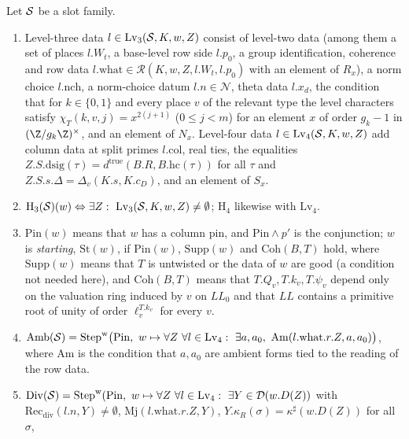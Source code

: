 \begin{definition}\label{pf:baselat1:def:levels}
Let $\mathcal S$ be a slot family.
\begin{enumerate}[label=(\alph*)]
\item Level-three data $l\in\mathrm{Lv}_3(\mathcal S,K,w,Z)$ consist of level-two data (among them a set of
  places $l.W_t$, a base-level row side $l.p_0$, a group identification, coherence and row data
  $l.\mathrm{what}\in\mathcal{R}(K,w,Z,l.W_t,l.p_0)$ with an element of $R_x$), a norm choice $l.\mathrm{nch}$,
  a norm-choice datum $l.n\in\mathcal{N}$, theta data $l.x_d$, the condition that for $k\in\{0,1\}$ and every
  place $v$ of the relevant type the level characters satisfy $\chi_T(k,v,j)=x^{2(j+1)}$ ($0\le j<m$) for an
  element $x$ of order $g_k-1$ in $(\Z/g_k\Z)^\times$, and an element of $N_x$. Level-four data
  $l\in\mathrm{Lv}_4(\mathcal S,K,w,Z)$ add column data at split primes $l.\mathrm{col}$, real ties, the
  equalities $Z.S.\mathrm{dsig}(\tau)=d^{\mathrm{true}}(B.R,B.\mathrm{hc}(\tau))$ for all $\tau$ and
  $Z.S.s.\Delta=\Delta_v(K.s,K.c_D)$, and an element of $S_x$.
\item $\mathrm{H}_3(\mathcal S)(w)\Leftrightarrow\exists Z:\ \mathrm{Lv}_3(\mathcal S,K,w,Z)\ne\emptyset$;
  $\mathrm{H}_4$ likewise with $\mathrm{Lv}_4$.
\item $\mathrm{Pin}(w)$ means that $w$ has a column pin, and $\mathrm{Pin}\wedge p'$ is the conjunction;
  $w$ is \emph{starting}, $\mathrm{St}(w)$, if $\mathrm{Pin}(w)$, $\mathrm{Supp}(w)$ and $\mathrm{Coh}(B,T)$ hold, where
  $\mathrm{Supp}(w)$ means that $T$ is untwisted or the data of $w$ are good (a condition not needed here), and
  $\mathrm{Coh}(B,T)$ means that $T.Q_v,T.k_v,T.\psi_v$ depend only on the valuation ring induced by $v$ on
  $\mathit{LL}_0$ and that $\mathit{LL}$ contains a primitive root of unity of order $\ell_v^{T.k_v}$ for every $v$.
\item $\mathrm{Amb}(\baselatoneS)=\mathrm{Step}^{\mathrm w}\bigl(\mathrm{Pin},\ w\mapsto\forall Z\ \forall
  l\in\mathrm{Lv}_4:\ \exists a,a_0,\ \mathrm{Am}(l.\mathrm{what}.r.Z,a,a_0)\bigr)$, where $\mathrm{Am}$ is the
  condition that $a,a_0$ are ambient forms tied to the reading of the row data.
\item $\mathrm{Div}(\mathcal S)=\mathrm{Step}^{\mathrm w}(\mathrm{Pin},\ w\mapsto\forall Z\ \forall l\in
  \mathrm{Lv}_4:\ \exists Y\in\mathcal{D}(w.D(Z))$ with $\mathrm{Rec}_{\mathrm{div}}(l.n,Y)\ne\emptyset$,
  $\mathrm{Mj}(l.\mathrm{what}.r.Z,Y)$, $Y.\kappa_R(\sigma)=\kappa^\sharp(w.D(Z))$ for all $\sigma$,

\end{enumerate}
\end{definition}
